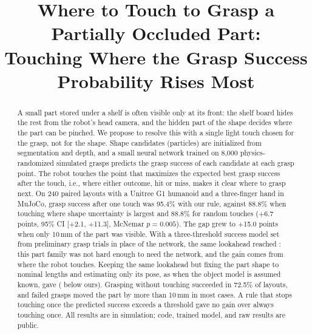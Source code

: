 \documentclass[conference]{IEEEtran}
\begin{document}
\title{Where to Touch to Grasp a Partially Occluded Part:\\Touching Where the Grasp Success Probability Rises Most}

\author{\IEEEauthorblockN{\AuthorName}
}

\maketitle

\begin{abstract}
A small part stored under a shelf is often visible only at its front: the shelf board hides the rest from the robot's head camera, and the hidden part of the shape decides where the part can be pinched. We propose to resolve this with a single light touch chosen for the grasp, not for the shape. Shape candidates (particles) are initialized from segmentation and depth, and a small neural network trained on 8,000 physics-randomized simulated grasps predicts the grasp success of each candidate at each grasp point. The robot touches the point that maximizes the expected best grasp success after the touch, i.e., where either outcome, hit or miss, makes it clear where to grasp next. On 240 paired layouts with a Unitree G1 humanoid and a three-finger hand in MuJoCo, grasp success after one touch was 95.4\% with our rule, against 88.8\% when touching where shape uncertainty is largest and 88.8\% for random touches (+6.7 points, 95\% CI [+2.1, +11.3], McNemar $p=0.005$). The gap grew to +15.0 points when only 10\,mm of the part was visible. With a three-threshold success model set from preliminary grasp trials in place of the network, the same lookahead reached \GeomSummary: this part family was not hard enough to need the network, and the gain comes from where the robot touches. Keeping the same lookahead but fixing the part shape to nominal lengths and estimating only its pose, as when the object model is assumed known, gave \FixSucc{} (\FixDiffShort{} below ours). Grasping without touching succeeded in 72.5\% of layouts, and failed grasps moved the part by more than 10\,mm in most cases. A rule that stops touching once the predicted success exceeds a threshold gave no gain over always touching once. All results are in simulation; code, trained model, and raw results are public.
\end{abstract}
\end{document}
